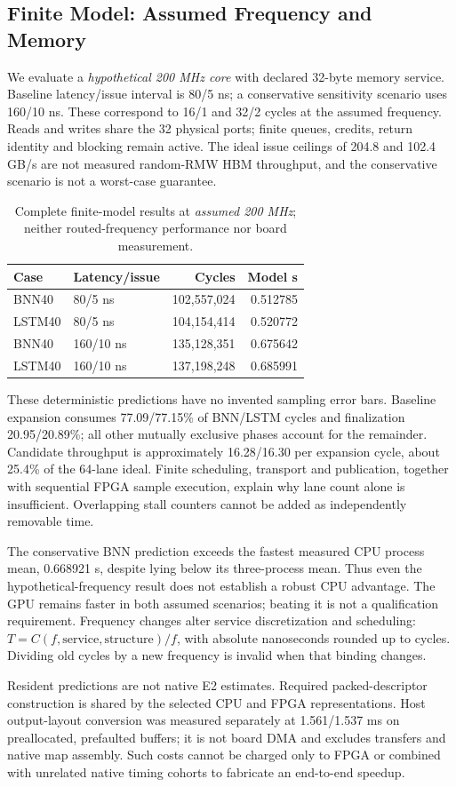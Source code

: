 \subsection{Finite Model: Assumed Frequency and Memory}
We evaluate a \emph{hypothetical 200 MHz core} with declared 32-byte memory service. Baseline latency/issue interval is 80/5 ns; a conservative sensitivity scenario uses 160/10 ns. These correspond to 16/1 and 32/2 cycles at the assumed frequency. Reads and writes share the 32 physical ports; finite queues, credits, return identity and blocking remain active. The ideal issue ceilings of 204.8 and 102.4 GB/s are not measured random-RMW HBM throughput, and the conservative scenario is not a worst-case guarantee.

\begin{table}[t]\centering
\caption{Complete finite-model results at \emph{assumed 200 MHz}; neither routed-frequency performance nor board measurement.}\label{tab:model}
\begin{tabular}{llrr}\toprule Case & Latency/issue & Cycles & Model s\\\midrule
BNN40 & 80/5 ns & 102,557,024 & 0.512785\\
LSTM40 & 80/5 ns & 104,154,414 & 0.520772\\
BNN40 & 160/10 ns & 135,128,351 & 0.675642\\
LSTM40 & 160/10 ns & 137,198,248 & 0.685991\\
\bottomrule\end{tabular}
\end{table}

These deterministic predictions have no invented sampling error bars. Baseline expansion consumes 77.09/77.15\% of BNN/LSTM cycles and finalization 20.95/20.89\%; all other mutually exclusive phases account for the remainder. Candidate throughput is approximately 16.28/16.30 per expansion cycle, about 25.4\% of the 64-lane ideal. Finite scheduling, transport and publication, together with sequential FPGA sample execution, explain why lane count alone is insufficient. Overlapping stall counters cannot be added as independently removable time.

The conservative BNN prediction exceeds the fastest measured CPU process mean, 0.668921 s, despite lying below its three-process mean. Thus even the hypothetical-frequency result does not establish a robust CPU advantage. The GPU remains faster in both assumed scenarios; beating it is not a qualification requirement. Frequency changes alter service discretization and scheduling: $T=C(f,\text{service},\text{structure})/f$, with absolute nanoseconds rounded up to cycles. Dividing old cycles by a new frequency is invalid when that binding changes.

Resident predictions are not native E2 estimates. Required packed-descriptor construction is shared by the selected CPU and FPGA representations. Host output-layout conversion was measured separately at 1.561/1.537 ms on preallocated, prefaulted buffers; it is not board DMA and excludes transfers and native map assembly. Such costs cannot be charged only to FPGA or combined with unrelated native timing cohorts to fabricate an end-to-end speedup.
